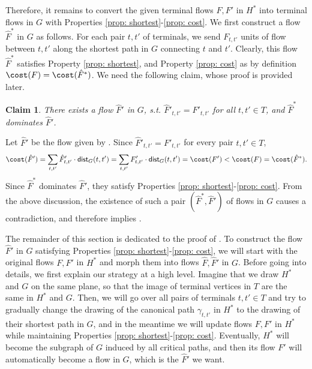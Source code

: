 \documentclass[11pt]{article}
\newtheorem{claim}[theorem]{Claim}
\newcommand{\dist}{\textnormal{\textsf{dist}}}
\newcommand{\set}[1]{\left\{ #1 \right\}}
\begin{document}
Therefore, it remains to convert the given terminal flows $F,F'$ in $H^*$ into terminal flows in $G$ with Properties \ref{prop: shortest}-\ref{prop: cost}.
We first construct a flow $\hat F^*$ in $G$ as follows. For each pair $t,t'$ of terminals, we send $F_{t,t'}$ units of flow between $t,t'$ along the shortest path in $G$ connecting $t$ and $t'$. Clearly, this flow $\hat F^*$ satisfies Property \ref{prop: shortest}, and Property \ref{prop: cost} as by definition $\cost(F)=\cost(\hat F^*)$.
We need the following claim, whose proof %
is provided later.

\begin{claim}
\label{clm: routable}
There exists a flow $\hat F'$ in $G$, s.t. $\hat F'_{t,t'}=F'_{t,t'}$ for all $t,t'\in T$, and $\hat F^*$ dominates $\hat F'$.
\end{claim}

 
Let $\hat F'$ be the flow given by .
Since $\hat F'_{t,t'}=F'_{t,t'}$ for every pair $t,t'\in T$, 
\[\cost(\hat F')=\sum_{t,t'}\hat F'_{t,t'}\cdot \dist_G(t,t')=\sum_{t,t'} F'_{t,t'}\cdot \dist_G(t,t')=\cost(F')<\cost(F)=\cost(\hat F^*).\]
Since $\hat F^*$ dominates $\hat F'$, they satisfy Properties \ref{prop: shortest}-\ref{prop: cost}. From the above discussion, the existence of such a pair $(\hat F^*,\hat F')$ of flows in $G$ causes a contradiction, and therefore implies .





The remainder of this section is dedicated to the proof of . To construct the flow $\hat{F}'$ in $G$ satisfying Properties \ref{prop: shortest}-\ref{prop: cost}, we will start with the original flows $F, F'$ in $H^*$ and morph them into flows $\hat{F}, \hat{F}'$ in $G$. Before going into details, we first explain our strategy at a high level. Imagine that we draw $H^*$ and $G$ on the same plane, so that the image of terminal vertices in $T$ are the same in $H^*$ and $G$. Then, we will go over all pairs of terminals $t, t'\in T$ and try to gradually change the drawing of the canonical path $\gamma_{t, t'}$ in $H^*$ to the drawing of their shortest path in $G$, and in the meantime we will update flows $F, F'$ in $H^*$ while maintaining Properties \ref{prop: shortest}-\ref{prop: cost}.
Eventually, $H^*$ will become the subgraph of $G$ induced by all critical paths, and then its flow $F'$ will automatically become a flow in $G$, which is the $\hat F'$ we want.
\end{document}

